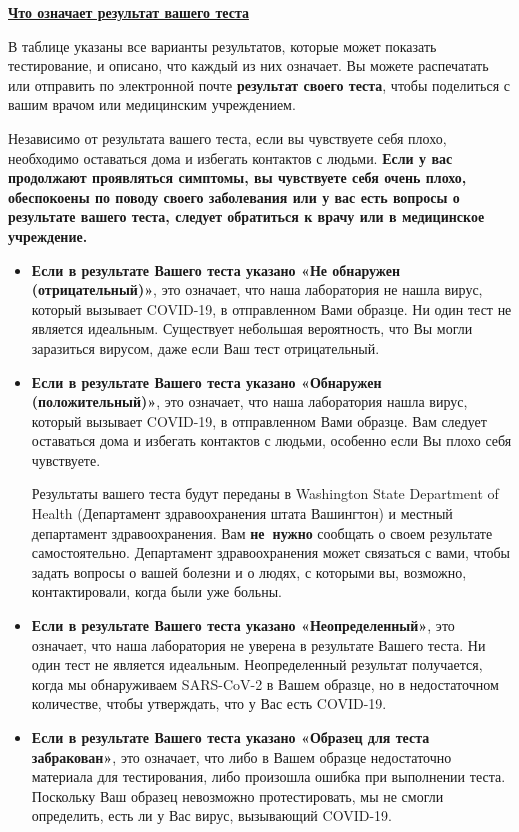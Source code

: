 \documentclass[10pt]{article}
\begin{document}
\large \underline{\textbf{Что означает результат вашего теста}}

В таблице указаны все варианты результатов, которые может показать тестирование,
и описано, что каждый из них означает. Вы можете распечатать или отправить по
электронной почте \textbf{результат своего теста}, чтобы поделиться с вашим
врачом или медицинским учреждением.

Независимо от результата вашего теста, если вы чувствуете себя плохо, необходимо
оставаться дома и избегать контактов с людьми. \textbf{Если у вас продолжают
проявляться симптомы, вы чувствуете себя очень плохо, обеспокоены по поводу
своего заболевания или у вас есть вопросы о результате вашего теста, следует
обратиться к врачу или в медицинское учреждение.}

\begin{itemize}


\item

  \textbf{Если в результате Вашего теста указано «Не обнаружен
  (отрицательный)»}, это означает, что наша лаборатория не нашла вирус, который
  вызывает COVID-19, в отправленном Вами образце. Ни один тест не является
  идеальным. Существует небольшая вероятность, что Вы могли заразиться вирусом,
  даже если Ваш тест отрицательный.

\item

  \textbf{Если в результате Вашего теста указано «Обнаружен (положительный)»},
  это означает, что наша лаборатория нашла вирус, который вызывает COVID-19, в
  отправленном Вами образце. Вам следует оставаться дома и избегать контактов
  с людьми, особенно если Вы плохо себя чувствуете.

  Результаты вашего теста будут переданы в Washington State Department of Health
  (Департамент здравоохранения штата Вашингтон) и местный департамент
  здравоохранения. Вам \textbf{не нужно} сообщать о своем результате
  самостоятельно. Департамент здравоохранения может связаться с вами, чтобы
  задать вопросы о вашей болезни и о людях, с которыми вы, возможно,
  контактировали, когда были уже больны.

\item

  \textbf{Если в результате Вашего теста указано «Неопределенный»}, это
  означает, что наша лаборатория не уверена в результате Вашего теста. Ни один
  тест не является идеальным. Неопределенный результат получается, когда мы
  обнаруживаем SARS-CoV-2 в Вашем образце, но в недостаточном количестве, чтобы
  утверждать, что у Вас есть COVID-19.

\item

  \textbf{Если в результате Вашего теста указано «Образец для теста
  забракован»}, это означает, что либо в Вашем образце недостаточно материала
  для тестирования, либо произошла ошибка при выполнении теста. Поскольку Ваш
  образец невозможно протестировать, мы не смогли определить, есть ли у Вас
  вирус, вызывающий COVID-19.

\end{itemize}
\end{document}
